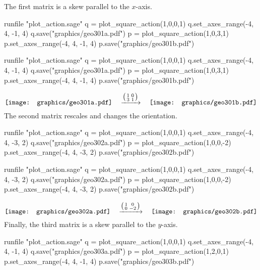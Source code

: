 The first matrix is a skew parallel to the $x$-axis.
\begin{sageoutput}[d,0,4;d,5,7]
runfile "plot_action.sage"
q = plot_square_action(1,0,0,1) 
q.set_axes_range(-4, 4, -1, 4) 
q.save("graphics/geo301a.pdf")
p = plot_square_action(1,0,3,1) 
p.set_axes_range(-4, 4, -1, 4) 
p.save("graphics/geo301b.pdf")
\end{sageoutput}
\begin{sagesilent}
runfile "plot_action.sage"
q = plot_square_action(1,0,0,1) 
q.set_axes_range(-4, 4, -1, 4) 
q.save("graphics/geo301a.pdf")
p = plot_square_action(1,0,3,1) 
p.set_axes_range(-4, 4, -1, 4) 
p.save("graphics/geo301b.pdf")
\end{sagesilent}
\begin{equation*}
  \vcenteredhbox{\texttt{[image: graphics/geo301a.pdf]}}
  \quad\mapsvia{\big (\begin{smallmatrix} 1 &0 \\ 3 &1 \end{smallmatrix}\big )}\quad
  \vcenteredhbox{\texttt{[image: graphics/geo301b.pdf]}}
\end{equation*}
\noindent
The second matrix rescales and changes the orientation.
\begin{sageoutput}[d,0,4;d,5,7]
runfile "plot_action.sage"
q = plot_square_action(1,0,0,1) 
q.set_axes_range(-4, 4, -3, 2) 
q.save("graphics/geo302a.pdf")
p = plot_square_action(1,0,0,-2) 
p.set_axes_range(-4, 4, -3, 2) 
p.save("graphics/geo302b.pdf")
\end{sageoutput}
\begin{sagesilent}
runfile "plot_action.sage"
q = plot_square_action(1,0,0,1) 
q.set_axes_range(-4, 4, -3, 2) 
q.save("graphics/geo302a.pdf")
p = plot_square_action(1,0,0,-2) 
p.set_axes_range(-4, 4, -3, 2) 
p.save("graphics/geo302b.pdf")
\end{sagesilent}
\begin{equation*}
  \vcenteredhbox{\texttt{[image: graphics/geo302a.pdf]}}
  \quad\mapsvia{\big (\begin{smallmatrix} 1 &0 \\ 0 &-2 \end{smallmatrix}\big )}\quad
  \vcenteredhbox{\texttt{[image: graphics/geo302b.pdf]}}
\end{equation*}
\noindent
Finally, the third matrix is a skew parallel to the $y$-axis.
\begin{sageoutput}[d,0,4;d,5,7]
runfile "plot_action.sage"
q = plot_square_action(1,0,0,1) 
q.set_axes_range(-4, 4, -1, 4) 
q.save("graphics/geo303a.pdf")
p = plot_square_action(1,2,0,1) 
p.set_axes_range(-4, 4, -1, 4) 
p.save("graphics/geo303b.pdf")
\end{sageoutput}
